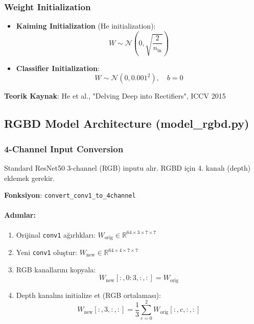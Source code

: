 \documentclass[12pt,a4paper]{article}
\begin{document}
\subsubsection{Weight Initialization}
\begin{itemize}
    \item \textbf{Kaiming Initialization} (He initialization):
    \begin{equation}
        W \sim \mathcal{N}\left(0, \sqrt{\frac{2}{n_{\text{in}}}}\right)
    \end{equation}
    
    \item \textbf{Classifier Initialization}:
    \begin{equation}
        W \sim \mathcal{N}(0, 0.001^2), \quad b = 0
    \end{equation}
\end{itemize}

\textbf{Teorik Kaynak}: He et al., "Delving Deep into Rectifiers", ICCV 2015

\subsection{RGBD Model Architecture (model\_rgbd.py)}

\subsubsection{4-Channel Input Conversion}

Standard ResNet50 3-channel (RGB) inputu alır. RGBD için 4. kanalı (depth) eklemek gerekir.

\textbf{Fonksiyon}: \texttt{convert\_conv1\_to\_4channel}

\paragraph{Adımlar:}
\begin{enumerate}
    \item Orijinal \texttt{conv1} ağırlıkları: $W_{\text{orig}} \in \mathbb{R}^{64 \times 3 \times 7 \times 7}$
    \item Yeni \texttt{conv1} oluştur: $W_{\text{new}} \in \mathbb{R}^{64 \times 4 \times 7 \times 7}$
    \item RGB kanallarını kopyala:
    \begin{equation}
        W_{\text{new}}[:, 0:3, :, :] = W_{\text{orig}}
    \end{equation}
    
    \item Depth kanalını initialize et (RGB ortalaması):
    \begin{equation}
        W_{\text{new}}[:, 3, :, :] = \frac{1}{3}\sum_{c=0}^{2} W_{\text{orig}}[:, c, :, :]
    \end{equation}
\end{enumerate}
\end{document}
